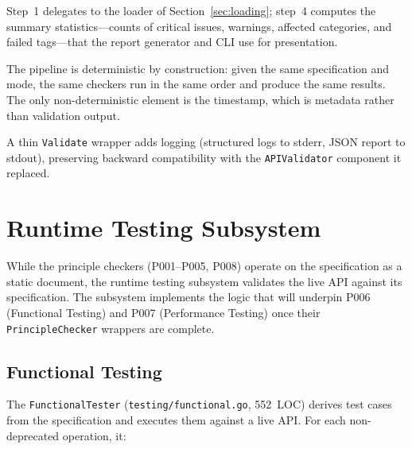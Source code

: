 Step~1 delegates to the loader of Section~\ref{sec:loading}; step~4 computes the summary statistics---counts of critical issues, warnings, affected categories, and failed tags---that the report generator and CLI use for presentation.

The pipeline is deterministic by construction: given the same specification and mode, the same checkers run in the same order and produce the same results. The only non-deterministic element is the timestamp, which is metadata rather than validation output.

A thin \texttt{Validate} wrapper adds logging (structured logs to stderr, JSON report to stdout), preserving backward compatibility with the \texttt{APIValidator} component it replaced.

\section{Runtime Testing Subsystem}
\label{sec:runtime-testing}

While the principle checkers (P001--P005, P008) operate on the specification as a static document, the runtime testing subsystem validates the live API against its specification. The subsystem implements the logic that will underpin P006 (Functional Testing) and P007 (Performance Testing) once their \texttt{PrincipleChecker} wrappers are complete.

\subsection{Functional Testing}
\label{subsec:functional-testing}

The \texttt{FunctionalTester} (\texttt{testing/functional.go}, 552~LOC) derives test cases from the specification and executes them against a live API. For each non-deprecated operation, it:

